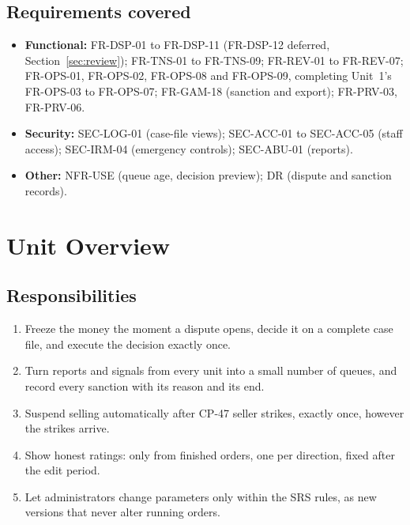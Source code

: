 \documentclass[11pt,a4paper]{article}
\begin{document}
\subsection{Requirements covered}
\begin{itemize}[nosep]
  \item \textbf{Functional:} FR-DSP-01 to FR-DSP-11 (FR-DSP-12 deferred, Section~\ref{sec:review}); FR-TNS-01 to FR-TNS-09; FR-REV-01 to FR-REV-07; FR-OPS-01, FR-OPS-02, FR-OPS-08 and FR-OPS-09, completing Unit~1's FR-OPS-03 to FR-OPS-07; FR-GAM-18 (sanction and export); FR-PRV-03, FR-PRV-06.
  \item \textbf{Security:} SEC-LOG-01 (case-file views); SEC-ACC-01 to SEC-ACC-05 (staff access); SEC-IRM-04 (emergency controls); SEC-ABU-01 (reports).
  \item \textbf{Other:} NFR-USE (queue age, decision preview); DR (dispute and sanction records).
\end{itemize}

\section{Unit Overview}

\subsection{Responsibilities}
\begin{enumerate}[nosep]
  \item Freeze the money the moment a dispute opens, decide it on a complete case file, and execute the decision exactly once.
  \item Turn reports and signals from every unit into a small number of queues, and record every sanction with its reason and its end.
  \item Suspend selling automatically after CP-47 seller strikes, exactly once, however the strikes arrive.
  \item Show honest ratings: only from finished orders, one per direction, fixed after the edit period.
  \item Let administrators change parameters only within the SRS rules, as new versions that never alter running orders.
\end{enumerate}
\end{document}
